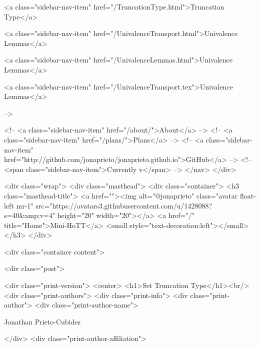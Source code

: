       
    
      
        
          <a class="sidebar-nav-item" href="/TruncationType.html">Truncation Type</a>
        
      
    
      
        
          <a class="sidebar-nav-item" href="/UnivalenceTransport.html">Univalence Lemmas</a>
        
      
    
      
        
          <a class="sidebar-nav-item" href="/UnivalenceLemmas.html">Univalence Lemmas</a>
        
      
    
      
        
          <a class="sidebar-nav-item" href="/UnivalenceTransport.tex">Univalence Lemmas</a>
        
      
     -->

    <!-- <a class="sidebar-nav-item" href="/about/">About</a> -->
    <!-- <a class="sidebar-nav-item" href="/plans/">Plans</a> -->
    <!-- <a class="sidebar-nav-item" href="http://github.com/jonaprieto/jonaprieto.github.io">GitHub</a> -->
    <!-- <span class="sidebar-nav-item">Currently v</span> -->
  </nav>
</div>

    <div class="wrap">
      <div class="masthead">
        <div class="container">
          <h3 class="masthead-title">
            <a href=""><img alt="@jonaprieto" class="avatar float-left mr-1" src="https://avatars3.githubusercontent.com/u/1428088?s=40&amp;v=4" height="20" width="20"></a>
            <a href="/" title="Home">Mini-HoTT</a>
            <small style="text-decoration:left"></small>
          </h3>
        </div>
      
      <div class="container content">
        







<div class="post">

  <div class="print-version">
    <center>
      <h1>Set Truncation Type</h1><br/>
        <div class="print-authors">
          <div class="print-info">
            <div class="print-author">
              <div class="print-author-name">
                
                  Jonathan Prieto-Cubides
                
              </div>
              <div class="print-author-affiliation">
                
